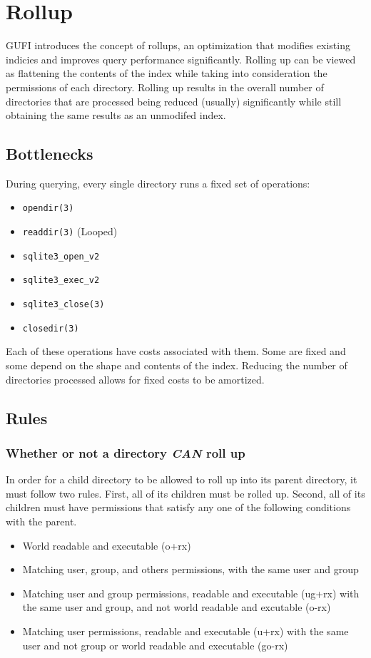 \section{Rollup}
GUFI introduces the concept of rollups, an optimization that modifies
existing indicies and improves query performance
significantly. Rolling up can be viewed as flattening the contents of
the index while taking into consideration the permissions of each
directory. Rolling up results in the overall number of directories
that are processed being reduced (usually) significantly while still
obtaining the same results as an unmodifed index.

\subsection{Bottlenecks}
During querying, every single directory runs a fixed set of
operations:

\begin{itemize}
  \item \texttt{opendir(3)}
  \item \texttt{readdir(3)} (Looped)
  \item \texttt{sqlite3\_open\_v2}
  \item \texttt{sqlite3\_exec\_v2}
  \item \texttt{sqlite3\_close(3)}
  \item \texttt{closedir(3)}
\end{itemize}

Each of these operations have costs associated with them. Some are
fixed and some depend on the shape and contents of the index. Reducing
the number of directories processed allows for fixed costs to be
amortized.

\subsection{Rules}
\label{rollup_rules}
\subsubsection{Whether or not a directory {\it CAN} roll up}
In order for a child directory to be allowed to roll up into its
parent directory, it must follow two rules. First, all of its children
must be rolled up. Second, all of its children must have permissions
that satisfy any one of the following conditions with the parent.

\begin{itemize}
  \item World readable and executable (o+rx)
  \item Matching user, group, and others permissions, with the same
    user and group
  \item Matching user and group permissions, readable and executable (ug+rx)
    with the same user and group, and not world readable and excutable
    (o-rx)
  \item Matching user permissions, readable and executable (u+rx) with
    the same user and not group or world readable and executable (go-rx)
\end{itemize}


